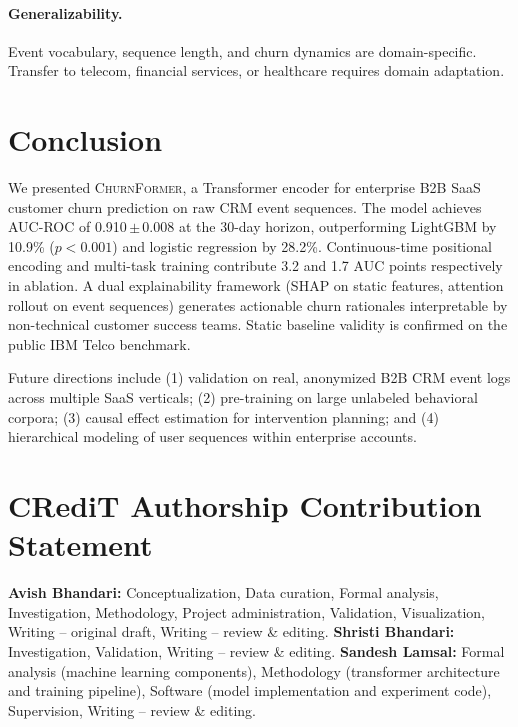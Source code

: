 \documentclass[review, 12pt]{elsarticle}
\newcommand{\model}{\textsc{ChurnFormer}}
\begin{document}
\paragraph{Generalizability.}
Event vocabulary, sequence length, and churn dynamics are domain-specific.
Transfer to telecom, financial services, or healthcare requires domain
adaptation.

\section{Conclusion}
\label{sec:conclusion}

We presented \model{}, a Transformer encoder for enterprise B2B SaaS customer
churn prediction on raw CRM event sequences.
The model achieves AUC-ROC of 0.910\,$\pm$\,0.008 at the 30-day horizon,
outperforming LightGBM by 10.9\% ($p < 0.001$) and logistic regression by
28.2\%.
Continuous-time positional encoding and multi-task training contribute 3.2
and 1.7 AUC points respectively in ablation.
A dual explainability framework (SHAP on static features, attention rollout on
event sequences) generates actionable churn rationales interpretable by
non-technical customer success teams.
Static baseline validity is confirmed on the public IBM Telco benchmark.

Future directions include (1) validation on real, anonymized B2B CRM event
logs across multiple SaaS verticals; (2) pre-training on large unlabeled
behavioral corpora; (3) causal effect estimation for intervention planning;
and (4) hierarchical modeling of user sequences within enterprise accounts.

\section*{CRediT Authorship Contribution Statement}
\textbf{Avish Bhandari:}
  Conceptualization,
  Data curation,
  Formal analysis,
  Investigation,
  Methodology,
  Project administration,
  Validation,
  Visualization,
  Writing -- original draft,
  Writing -- review \& editing.
\textbf{Shristi Bhandari:}
  Investigation,
  Validation,
  Writing -- review \& editing.
\textbf{Sandesh Lamsal:}
  Formal analysis (machine learning components),
  Methodology (transformer architecture and training pipeline),
  Software (model implementation and experiment code),
  Supervision,
  Writing -- review \& editing.
\end{document}
